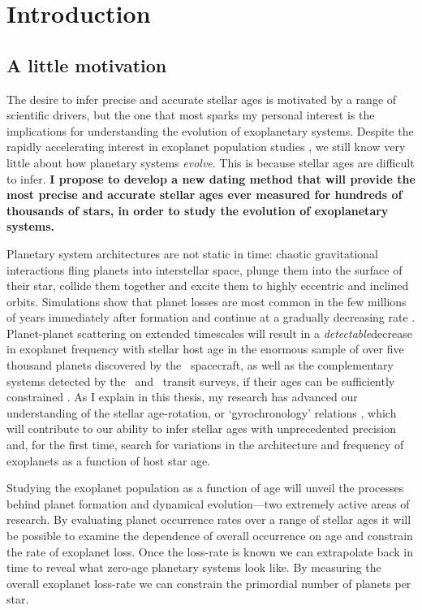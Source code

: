 \section*{Introduction}
\subsection*{A little motivation}

The desire to infer precise and accurate stellar ages is motivated by a range
of scientific drivers, but the one that most sparks my personal interest is
the implications for understanding the evolution of exoplanetary systems.
Despite the rapidly accelerating interest in exoplanet population studies
\citep[e.g.][]{petigura, dressing, foreman-mackey, burke}, we still know very
little about how planetary systems {\it evolve}.
This is because stellar ages are difficult to infer.
{\bf I propose to develop a new dating method that will provide the most
precise and accurate stellar ages ever measured for hundreds of thousands of
stars, in order to study the evolution of exoplanetary systems.}

Planetary system architectures are not static in time: chaotic gravitational
interactions fling planets into interstellar space, plunge them into the
surface of their star, collide them together and excite them to highly
eccentric and inclined orbits.
Simulations show that planet losses are most common in the few millions of
years immediately after formation and continue at a gradually decreasing rate
\citep[e.g.][]{zhou, smith, funk, Pu2015}.
Planet-planet scattering on extended timescales will result in a {\it
detectable}\/decrease in exoplanet frequency with stellar host age in the
enormous sample of over five thousand planets discovered by the \Kepler\
spacecraft, as well as the complementary systems detected by the \Ktwo\ and
\TESS\ transit surveys, if their ages can be sufficiently constrained
\citep{veras}.
As I explain in this thesis, my research has advanced our understanding of the
stellar age-rotation, or `gyrochronology' relations \citep{angus}, which will
contribute to our ability to infer stellar ages with unprecedented precision
and, for the first time, search for variations in the architecture and
frequency of exoplanets as a function of host star age.

Studying the exoplanet population as a function of age will unveil the
processes behind planet formation and dynamical evolution---two extremely
active areas of research.
By evaluating planet occurrence rates over a range of stellar ages it will be
possible to examine the dependence of overall occurrence on age and constrain
the rate of exoplanet loss.
Once the loss-rate is known we can extrapolate back in time to reveal what
zero-age planetary systems look like.
By measuring the overall exoplanet loss-rate we can constrain the primordial
number of planets per star.

